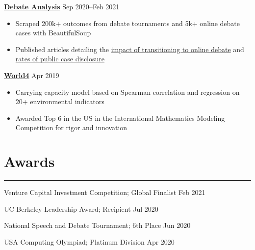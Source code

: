 \documentclass[11pt]{article}
\newcommand{\resumesection}[1]{\vspace{-0.6cm}\section*{\color{highlight}#1}\vspace{-0.3cm}\hrule\vspace{0.2cm}}
\begin{document}
\textbf{\href{https://github.com/petezh/E-Debate}{Debate Analysis}} \hfill Sep 2020--Feb 2021\par
\begin{itemize}
	\item Scraped 200k+ outcomes from debate tournaments and 5k+ online debate cases with BeautifulSoup
	\item Published articles detailing the \href{https://www.vbriefly.com/2020/12/31/five-trends-among-e-debate-competitors-by-peter-zhang/}{impact of transitioning to online debate} and \href{https://www.vbriefly.com/2021/01/22/disclosure-in-numbers-by-peter-zhang/}{rates of public case disclosure}
\end{itemize}\vspace{0.1cm} \par

\textbf{\href{https://github.com/gautomdas/IMMC-World4/blob/master/US-9365.pdf}{World4}} \hfill Apr 2019\par
\begin{itemize}
	\item Carrying capacity model based on Spearman correlation and regression on 20+ environmental indicators
	\item Awarded Top 6 in the US in the International Mathematics Modeling Competition for rigor and innovation
\end{itemize}

\resumesection{Awards}

Venture Capital Investment Competition; Global Finalist \hfill Feb 2021\par
UC Berkeley Leadership Award; Recipient \hfill Jul 2020 \par
National Speech and Debate Tournament; 6th Place \hfill Jun 2020 \par
USA Computing Olympiad; Platinum Division \hfill Apr 2020 \par
\end{document}
